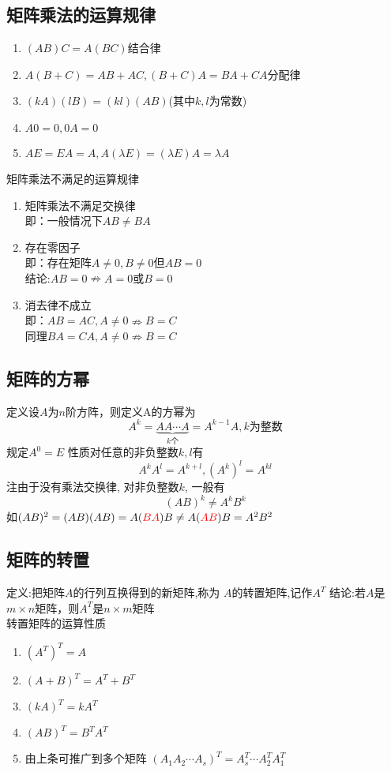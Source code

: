 \subsection{矩阵乘法的运算规律}
\begin{enumerate}
    \item{
        $(AB)C=A(BC)$结合律
    }
    \item{
        $A(B+C)=AB+AC,(B+C)A=BA+CA$分配律
    }
    \item{
        $(kA)(lB)=(kl)(AB)$(其中$k,l$为常数)
    }
    \item{
        $A0=0, 0A=0$
    }
    \item{
        $AE=EA=A,A(\lambda E)=(\lambda E)A=\lambda A$
    }
\end{enumerate}
矩阵乘法{\color{red}不满足}的运算规律
\begin{enumerate}
    \item{
        矩阵乘法不满足交换律\\
        即：一般情况下$AB\ne BA$
    }
    \item{
        存在零因子\\
        即：存在矩阵$A\ne 0,B\ne 0$但$AB=0$\\
        结论:$AB=0\nRightarrow A=0\text{或}B=0$
    }
    \item{
        消去律不成立\\
        即：$AB=AC,A\neq 0\nRightarrow B=C$\\
        同理$BA=CA,A\neq 0\nRightarrow B=C$\\
    }
\end{enumerate}
\subsection{矩阵的方幂}
{\color{red}定义}设$A$为$n$阶方阵，则定义A的方幂为
$$
{{A}^{k}}=\underbrace{AA\cdots A}_{k\text{个}}={{A}^{k-1}}A,k\text{为整数}
$$
{\color{blue}规定\quad}$A^{0}=E$
{\color{blue}性质\quad}对任意的非负整数$k,l$有
$$
{{A}^{k}}{{A}^{l}}={{A}^{k+l}},{({{A}^{k}})}^{l}={A}^{kl}
$$
{\color{red}注\quad}由于没有乘法交换律, 对非负整数$k$, 一般有
$$
{{(AB)}^{k}}\ne {{A}^{k}}{{B}^{k}}
$$
如$(AB)^2=(AB)(AB)=A({\color{red}BA})B\neq A({\color{red}AB})B=A^2B^2$
\subsection{矩阵的转置}
{\color{red}定义:}把矩阵$A$的{\color{blue}行列互换}得到的新矩阵,称为
$A$的转置矩阵,记作$A^T$
{\color{blue}结论:\quad}若$A$是$m\times n$矩阵，则$A^T$是$n\times m$矩阵\\
{\color{blue}转置矩阵的运算性质}
\begin{enumerate}
   \item{
       $(A^T)^T=A$
   } 
   \item{
        ${{(A+B)}^{T}}={{A}^{T}}+{{B}^{T}}$
   }
   \item{
        ${{(kA)}^{T}}=k{{A}^{T}}$
   }
   \item{
        ${{(AB)}^{T}}={{B}^{T}}{{A}^{T}}$
   }
   \item{
    由上条可推广到多个矩阵
        ${{({{A}_{1}}{{A}_{2}}\cdots {{A}_{s}})}^{T}}=A_{s}^{T}\cdots A_{2}^{T}A_{1}^{T}$
   }
\end{enumerate}
